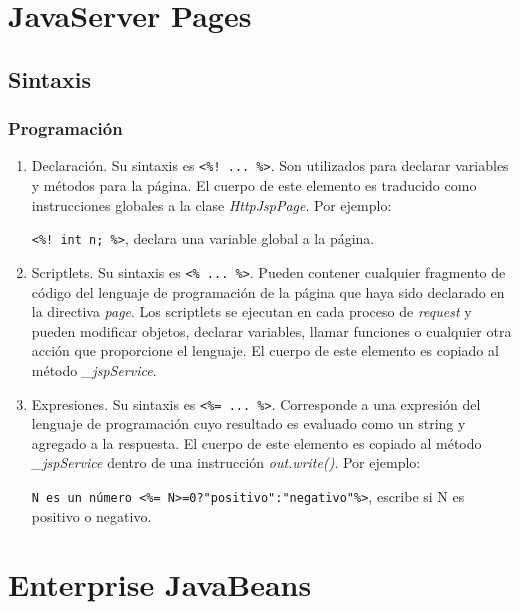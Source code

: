 \documentclass[12pt,oneside,letterpaper]{report}
\newcommand{\cls}[1]{\mbox{\textit{#1}}} %
\newcommand{\trm}[1]{\textit{#1}} %
\newcommand{\cod}[1]{\texttt{\footnotesize #1}} %
\begin{document}
\section{JavaServer Pages}

\subsection{Sintaxis}

\subsubsection{Programación}

\begin{enumerate}
\item
Declaración. Su sintaxis es \mbox{\cod{<\%! ... \%>}}. Son utilizados para
declarar variables y métodos para la página. El cuerpo de este elemento es
traducido como instrucciones globales a la clase \cls{HttpJspPage}. Por
ejemplo:

\cod{<\%! int n; \%>}, declara una variable global a la página.

\item
Scriptlets. Su sintaxis es \cod{<\% ... \%>}. Pueden contener cualquier
fragmento de código del lenguaje de programación de la página que haya
sido declarado en la directiva \cls{page}. Los scriptlets se ejecutan en
cada proceso de \trm{request} y pueden modificar objetos, declarar
variables, llamar funciones o cualquier otra acción que proporcione el
lenguaje. El cuerpo de este elemento es copiado al método
\cls{\_jspService}.

\item
Expresiones. Su sintaxis es \cod{<\%= ... \%>}. Corresponde a una
expresión del lenguaje de programación cuyo resultado es evaluado como un
string y agregado a la respuesta. El cuerpo de este elemento es copiado al
método \cls{\_jspService} dentro de una instrucción \cls{out.write()}. Por
ejemplo:

\cod{N es un número <\%=
N>=0?\cod{"}positivo\cod{"}:\cod{"}negativo\cod{"}\%>}, escribe si N es
positivo o negativo.

\end{enumerate}

\section{Enterprise JavaBeans}
\label{sec:ejb}
\end{document}
